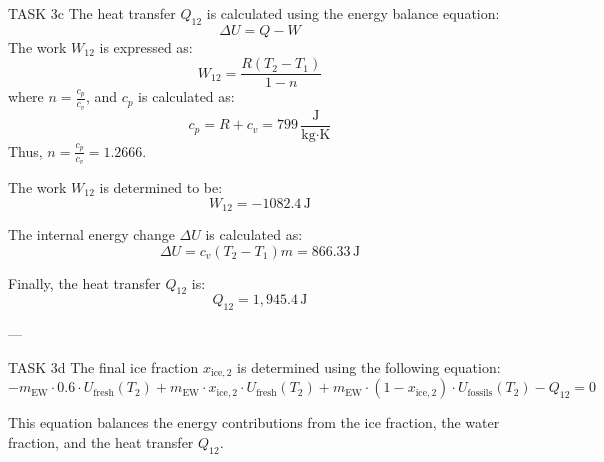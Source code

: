 TASK 3c  
The heat transfer \( Q_{12} \) is calculated using the energy balance equation:  
\[
\Delta U = Q - W
\]  
The work \( W_{12} \) is expressed as:  
\[
W_{12} = \frac{R(T_2 - T_1)}{1 - n}
\]  
where \( n = \frac{c_p}{c_v} \), and \( c_p \) is calculated as:  
\[
c_p = R + c_v = 799 \, \frac{\text{J}}{\text{kg·K}}
\]  
Thus, \( n = \frac{c_p}{c_v} = 1.2666 \).  

The work \( W_{12} \) is determined to be:  
\[
W_{12} = -1082.4 \, \text{J}
\]  

The internal energy change \( \Delta U \) is calculated as:  
\[
\Delta U = c_v (T_2 - T_1) m = 866.33 \, \text{J}
\]  

Finally, the heat transfer \( Q_{12} \) is:  
\[
Q_{12} = 1,945.4 \, \text{J}
\]  

---

TASK 3d  
The final ice fraction \( x_{\text{ice},2} \) is determined using the following equation:  
\[
- m_{\text{EW}} \cdot 0.6 \cdot U_{\text{fresh}}(T_2) + m_{\text{EW}} \cdot x_{\text{ice},2} \cdot U_{\text{fresh}}(T_2) + m_{\text{EW}} \cdot (1 - x_{\text{ice},2}) \cdot U_{\text{fossils}}(T_2) - Q_{12} = 0
\]  

This equation balances the energy contributions from the ice fraction, the water fraction, and the heat transfer \( Q_{12} \).